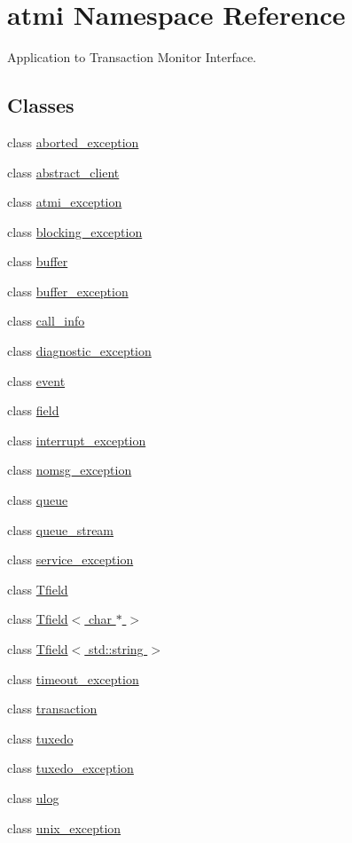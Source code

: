 \hypertarget{namespaceatmi}{\section{atmi Namespace Reference}
\label{namespaceatmi}
}


Application to Transaction Monitor Interface.  


\subsection*{Classes}
\begin{DoxyCompactItemize}
\item 
class \hyperlink{classatmi_1_1aborted__exception}{aborted\+\_\+exception}
\item 
class \hyperlink{classatmi_1_1abstract__client}{abstract\+\_\+client}
\item 
class \hyperlink{classatmi_1_1atmi__exception}{atmi\+\_\+exception}
\item 
class \hyperlink{classatmi_1_1blocking__exception}{blocking\+\_\+exception}
\item 
class \hyperlink{classatmi_1_1buffer}{buffer}
\item 
class \hyperlink{classatmi_1_1buffer__exception}{buffer\+\_\+exception}
\item 
class \hyperlink{classatmi_1_1call__info}{call\+\_\+info}
\item 
class \hyperlink{classatmi_1_1diagnostic__exception}{diagnostic\+\_\+exception}
\item 
class \hyperlink{classatmi_1_1event}{event}
\item 
class \hyperlink{classatmi_1_1field}{field}
\item 
class \hyperlink{classatmi_1_1interrupt__exception}{interrupt\+\_\+exception}
\item 
class \hyperlink{classatmi_1_1nomsg__exception}{nomsg\+\_\+exception}
\item 
class \hyperlink{classatmi_1_1queue}{queue}
\item 
class \hyperlink{classatmi_1_1queue__stream}{queue\+\_\+stream}
\item 
class \hyperlink{classatmi_1_1service__exception}{service\+\_\+exception}
\item 
class \hyperlink{classatmi_1_1_tfield}{Tfield}
\item 
class \hyperlink{classatmi_1_1_tfield_3_01char_01_5_01_4}{Tfield$<$ char $\ast$ $>$}
\item 
class \hyperlink{classatmi_1_1_tfield_3_01std_1_1string_01_4}{Tfield$<$ std\+::string $>$}
\item 
class \hyperlink{classatmi_1_1timeout__exception}{timeout\+\_\+exception}
\item 
class \hyperlink{classatmi_1_1transaction}{transaction}
\item 
class \hyperlink{classatmi_1_1tuxedo}{tuxedo}
\item 
class \hyperlink{classatmi_1_1tuxedo__exception}{tuxedo\+\_\+exception}
\item 
class \hyperlink{classatmi_1_1ulog}{ulog}
\item 
class \hyperlink{classatmi_1_1unix__exception}{unix\+\_\+exception}
\end{DoxyCompactItemize}
